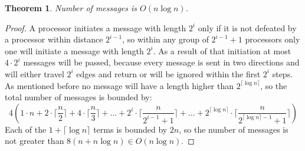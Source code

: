 \documentclass[a4paper,12pt]{article}
\newtheorem{theorem}{Theorem}
\begin{document}
\begin{theorem}
Number of messages is $O(n\log n)$.
\end{theorem}
\begin{proof}
A processor initiates a message with length $2^i$ only if it is not defeated by a processor within distance $2^{i-1}$, so within any group of $2^{i-1}+1$ processors only one will initiate a message with length $2^i$. As a result of that initiation at most $4\cdot2^i$ messages will be passed, because every message is sent in two directions and will either travel $2^i$ edges and return or will be ignored within the first $2^i$ steps. As mentioned before no message will have a length higher than $2^{\lceil\log n\rceil}$, so the total number of messages is bounded by:
$$4(1\cdot n +2\cdot\lceil\frac{n}{2}\rceil+4\cdot\lceil\frac{n}{3}\rceil+\dots+2^i\cdot\lceil\frac{n}{2^{i-1}+1}\rceil+\dots+2^{\lceil\log n\rceil}\cdot\lceil\frac{n}{2^{\lceil\log n\rceil-1}+1}\rceil)$$
Each of the $1+\lceil\log n\rceil$ terms is bounded by $2n$, so the number of messages is not greater than $8(n+n\log n)\in O(n\log n)$.
\end{proof}

\printbibliography
\end{document}
